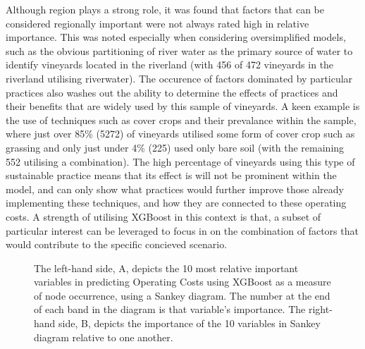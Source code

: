 \documentclass[review,12pt,authoryear]{elsarticle}
\begin{document}
\begin{linenumbers}
\par
Although region plays a strong role, it was found that factors that can be considered regionally important were not always rated high in relative importance. This was noted especially when considering oversimplified models, such as the obvious partitioning of river water as the primary source of water to identify vineyards located in the riverland (with 456 of 472 vineyards in the riverland utilising riverwater). The occurence of factors dominated by particular practices also washes out the ability to determine the effects of practices and their benefits that are widely used by this sample of vineyards. A keen example is the use of techniques such as cover crops and their prevalance within the sample, where just over 85\% (5272) of vineyards utilised some form of cover crop such as grassing and only just under 4\% (225) used only bare soil (with the remaining 552 utilising a combination). The high percentage of vineyards using this type of sustainable practice means that its effect is will not be prominent within the model, and can only show what practices would further improve those already implementing these techniques, and how they are connected to these operating costs. A strength of utilising XGBoost in this context is that, a subset of particular interest can be leveraged to focus in on the combination of factors that would contribute to the specific concieved scenario.
\par
\begin{figure}[htb]
  \caption{The left-hand side, A,  depicts the 10 most relative  important variables in predicting Operating Costs using XGBoost as a measure of node occurrence, using a Sankey diagram. The number at the end of each band in the diagram is that variable's importance. The right-hand side, B, depicts the importance of the 10 variables in Sankey diagram relative to one another.}\label{fig:operating_costs_sankey}
 \end{figure}



\end{linenumbers}
\end{document}

